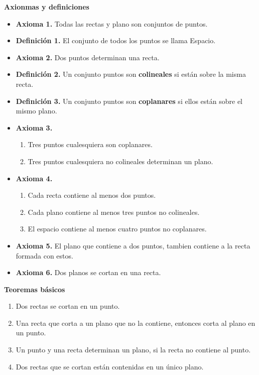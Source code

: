 \textbf{Axionmas y definiciones}
\begin{itemize}
    \item \textbf{Axioma 1.} Todas las rectas y plano son conjuntos de puntos.
    \item \textbf{Definición 1.} El conjunto de todos los puntos se llama Espacio.
    \item \textbf{Axioma 2.} Dos puntos determinan una recta.
    \item \textbf{Definición 2.} Un conjunto puntos son \textbf{colineales} si están sobre la misma recta.
    \item \textbf{Definición 3.} Un conjunto puntos son \textbf{coplanares} si ellos están sobre el mismo plano.
    \item \textbf{Axioma 3.}
        \begin{enumerate}
            \item Tres puntos cualesquiera son coplanares.
            \item Tres puntos cualesquiera no colineales determinan un plano.
        \end{enumerate}
    \item \textbf{Axioma 4.}
    \begin{enumerate}
        \item Cada recta contiene al menos dos puntos.
        \item Cada plano contiene al menos tres puntos no colineales.
        \item El espacio contiene al menos cuatro puntos no coplanares.
    \end{enumerate}
    \item \textbf{Axioma 5.} El plano que contiene a dos puntos, tambien contiene a la recta formada con estos.
    \item \textbf{Axioma 6.} Dos planos se cortan en una recta.
\end{itemize}

\textbf{Teoremas básicos}

\begin{enumerate}
    \item Dos rectas se cortan en un punto.
    \item Una recta que corta a un plano que no la contiene, entonces corta al plano en un punto.
    \item Un punto y una recta determinan un plano, si la recta no contiene al punto.
    \item Dos rectas que se cortan están contenidas en un único plano.
\end{enumerate}

